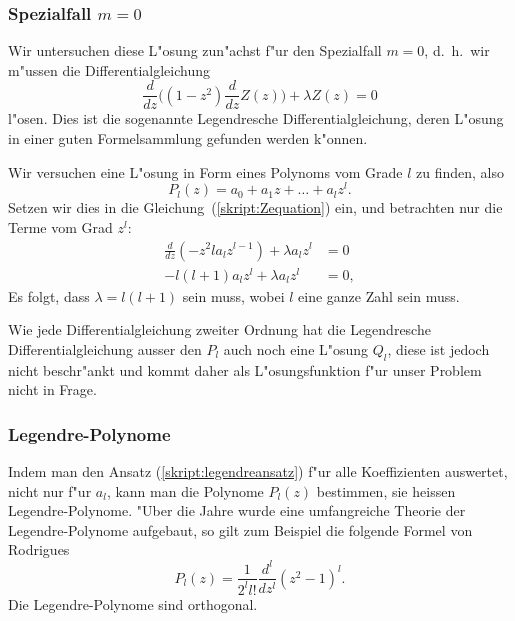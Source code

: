 \subsubsection{Spezialfall $m=0$}
Wir untersuchen diese L"osung zun"achst f"ur den Spezialfall $m=0$,
d.~h.~wir m"ussen die Differentialgleichung
\begin{equation}
\frac{d}{dz}\biggl(
(1-z^2)\frac{d}{dz}Z(z)
\biggr)
+\lambda Z(z)=0
\label{skript:Zequation}
\end{equation}
l"osen.
Dies ist die sogenannte Legendresche Differentialgleichung,
deren L"osung in einer guten Formelsammlung gefunden werden k"onnen.

Wir versuchen eine L"osung in Form eines Polynoms vom
Grade $l$ zu finden, also 
\begin{equation}
P_l(z)=a_0+a_1z+\dots+a_lz^l.
\label{skript:legendreansatz}
\end{equation}
Setzen wir dies in die Gleichung~(\ref{skript:Zequation}) ein, und betrachten nur die
Terme vom Grad $z^l$:
\begin{align*}
\frac{d}{dz}(-z^2la_lz^{l-1})
+
\lambda a_lz^l&=0
\\
-l(l+1)a_lz^l+\lambda a_lz^l&=0,
\end{align*}
Es folgt, dass $\lambda = l(l+1)$ sein muss, wobei $l$ eine ganze
Zahl sein muss.

Wie jede Differentialgleichung zweiter Ordnung hat die Legendresche
Differentialgleichung ausser den $P_l$ auch noch eine L"osung
$Q_l$, diese ist jedoch nicht beschr"ankt und kommt daher als L"osungsfunktion
f"ur unser Problem nicht in Frage.

\subsubsection{Legendre-Polynome}
Indem man den Ansatz (\ref{skript:legendreansatz}) f"ur alle Koeffizienten
auswertet, nicht nur f"ur $a_l$, kann man die Polynome $P_l(z)$ 
bestimmen, sie heissen Legendre-Polynome.
"Uber die Jahre wurde eine umfangreiche Theorie der Legendre-Polynome
aufgebaut, so gilt zum Beispiel die folgende Formel von Rodrigues
\[
P_l(z)=\frac1{2^ll!}\frac{d^l}{dz^l}(z^2 - 1)^l.
\]
Die Legendre-Polynome sind orthogonal.


